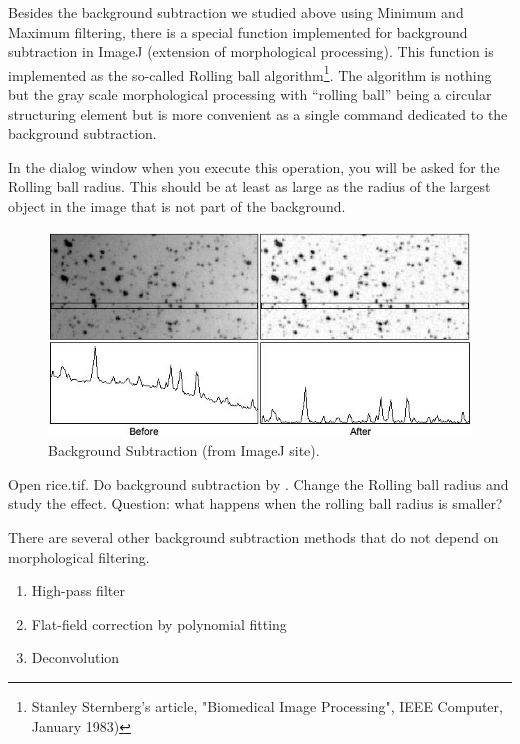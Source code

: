 Besides the background subtraction we studied above using Minimum and
Maximum filtering, there is a special function implemented for
background subtraction in ImageJ (extension of morphological processing). This function is implemented as the so-called Rolling ball algorithm\footnote{
Stanley Sternberg's article, "Biomedical Image Processing", IEEE Computer, January 1983) }. The algorithm is nothing but the gray scale morphological processing with ``rolling ball'' being a circular structuring element but is more convenient as a single command dedicated to the background subtraction. 

In the dialog window when you execute this operation, you will be asked for
the Rolling ball radius. This should be at least as large as
the radius of the largest object in the image that is not part of the
background.

\begin{figure}[htbp]
\begin{center}
\includegraphics[width=11.875cm]{fig/CMCIBasicCourse201102-img69.jpg}
\caption{ Background Subtraction (from ImageJ site).}
\label{fig:img69}
\end{center}
\end{figure}


\begin{indentexercise}{1}
Open rice.tif. Do background
subtraction by .
Change the Rolling ball radius and study the effect. Question: what
happens when the rolling ball radius is smaller?
\end{indentexercise}

There are several other background subtraction methods that do not depend on morphological filtering. 
 
\begin{enumerate}
  \item High-pass filter
  \item Flat-field correction by polynomial fitting
  \item Deconvolution
\end{enumerate}

